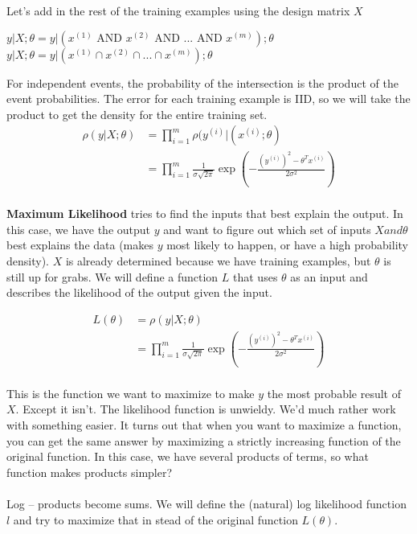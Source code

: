 \documentclass{article}
\begin{document}
Let's add in the rest of the training examples using the design matrix $X$
\begin{center}
$y|X ; \theta = y|(x^{(1)} \text{ AND } x^{(2)} \text{ AND } ... \text{ AND } x^{(m)}) ; \theta $\\
$y|X ; \theta = y|(x^{(1)} \cap x^{(2)} \cap ... \cap x^{(m)}) ; \theta $\\
\end{center}

For independent events, the probability of the intersection is the product of the event probabilities. The error for each training example is IID, so we will take the product to get the density for the entire training set.
\begin{align*}
\rho(y|X ; \theta) &= \prod_{i=1}^m \rho(y^{(i)}|(x^{(i)};\theta)\\
&=\prod_{i=1}^m \frac{1}{\sigma\sqrt{2\pi}} \exp(-\frac{(y^{(i)})^2-\theta^Tx^{(i)}}{2\sigma^2})\\
\end{align*}

\textbf{Maximum Likelihood} tries to find the inputs that best explain the output. In this case, we have the output $y$ and want to figure out which set of inputs $X and \theta$ best explains the data (makes $y$ most likely to happen, or have a high probability density). $X$ is already determined because we have training examples, but $\theta$ is still up for grabs. We will define a function $L$ that uses $\theta$ as an input and describes the likelihood of the output given the input.

\begin{align*}
L(\theta) &= \rho(y|X;\theta)\\
&=\prod_{i=1}^m \frac{1}{\sigma\sqrt{2\pi}} \exp(-\frac{(y^{(i)})^2-\theta^Tx^{(i)}}{2\sigma^2})\\
\end{align*} 

This is the function we want to maximize to make $y$ the most probable result of $X$. Except it isn't. The likelihood function is unwieldy. We'd much rather work with something easier. It turns out that when you want to maximize a function, you can get the same answer by maximizing a strictly increasing function of the original function. In this case, we have several products of terms, so what function makes products simpler?\\
\\
Log -- products become sums. We will define the (natural) log likelihood function $l$ and try to maximize that in stead of the original function $L(\theta)$.\\
\end{document}
